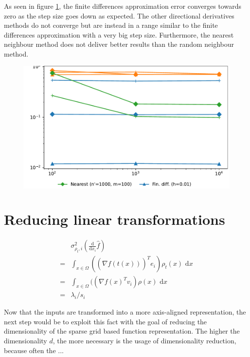 \documentclass[
  a4paper,  %
  twoside,  %
  bibliography=totoc,
  headsepline,
  cleardoublepage=empty,
  parskip=half,
  draft=false
]{scrbook}
\begin{document}
As seen in figure \ref{fig:as_approx}, the finite differences approximation error converges towards zero as the step size goes down as expected.
The other directional derivatives methods do not converge but are instead in a range similar to the finite differences approximation with a very big step size.
Furthermore, the nearest neighbour method does not deliver better results than the random neighbour method.

\begin{figure}[H]
\begin{center}
	\includegraphics[width=\textwidth]{graphics/as_grad_errors}
\end{center}
	\label{fig:as_approx}
\end{figure}


\chapter{Reducing linear transformations}

\begin{equation}
\begin{split}
&\sigma^2_{\rho_t,i}(\frac{\text{d}}{\text{d}x_i} \hat{f})\\
=&\int_{x \in \Omega} ((\nabla \hat{f}(t(x)))^T e_i) \rho_t(x) \text{ d}x\\
=&\int_{x \in \Omega} ((\nabla f(x)^T v_i) \rho(x) \text{ d}x\\
=&\lambda_i / s_i
\end{split}
\end{equation}


Now that the inputs are transformed into a more axis-aligned representation, the next step would be to exploit this fact with the goal of reducing the dimensionality of the sparse grid based function representation.
The higher the dimensionality $d$, the more necessary is the usage of dimensionality reduction, because often the ...
\end{document}
